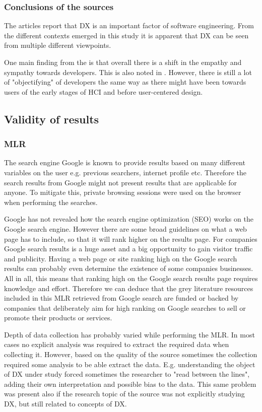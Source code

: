 \documentclass[english, 12pt, a4paper, sci, utf8, a-1b, online]{aaltothesis}
\begin{document}
\subsubsection{Conclusions of the sources}

The articles report that DX is an important factor of software engineering. From the different contexts emerged in this study it is apparent that DX can be seen from multiple different viewpoints.

One main finding from the is that overall there is a shift in the empathy and sympathy towards developers. This is also noted in \cite{voice-of-the-developer}. However, there is still a lot of "objectifying" of developers the same way as there might have been towards users of the early stages of HCI and before user-centered design.

\subsection{Validity of results}

\subsubsection{MLR}

The search engine Google is known to provide results based on many different variables on the user e.g. previous searchers, internet profile etc. Therefore the search results from Google might not present results that are applicable for anyone. To mitigate this, private browsing sessions were used on the browser when performing the searches.

Google has not revealed how the search engine optimization (SEO) works on the Google search engine. However there are some broad guidelines on what a web page has to include, so that it will rank higher on the results page. For companies Google search results is a huge asset and a big opportunity to gain visitor traffic and publicity. Having a web page or site ranking high on the Google search results can probably even determine the existence of some companies businesses. All in all, this means that ranking high on the Google search results page requires knowledge and effort. Therefore we can deduce that the grey literature resources included in this MLR retrieved from Google search are funded or backed by companies that deliberately aim for high ranking on Google searches to sell or promote their products or services.

Depth of data collection has probably varied while performing the MLR. In most cases no explicit analysis was required to extract the required data when collecting it. However, based on the quality of the source sometimes the collection required some analysis to be able extract the data. E.g. understanding the object of DX under study forced sometimes the researcher to "read between the lines", adding their own interpretation and possible bias to the data. This same problem was present also if the research topic of the source was not explicitly  studying DX, but still related to concepts of DX.
\end{document}
